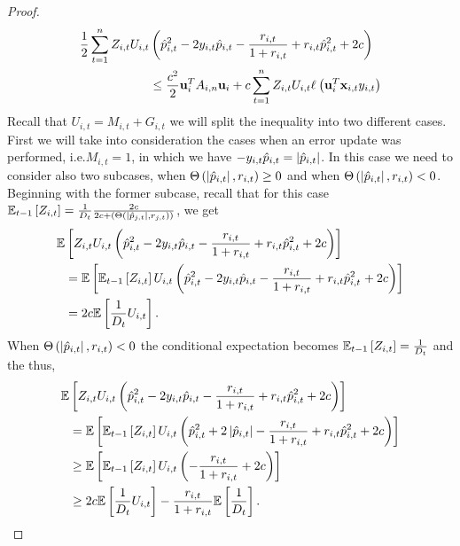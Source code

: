 \begin{proof}
\begin{equation}
\begin{split}
\frac{1}{2} \sum_{t=1}^{n}Z_{i,t}U_{i,t}&\left({\hat{p}_{i,t}^2-2y_{i,t}\hat{p}_{i,t}-\frac{r_{i,t}}{1+r_{i,t}}+r_{i,t}\hat{p}_{i,t}^{2}+2c}\right)\\
&\le\frac{c^2}{2} \mathbf{u}_i^T A_{i,n} \mathbf{u}_i+c\sum_{t=1}^{n}{Z_{i,t}U_{i,t}\ell_{}\left({\mathbf{u}_i^T\mathbf{x}_{i,t}y_{i,t}}\right)}
\label{sec_order_2}
\end{split}
\end{equation}
Recall that $U_{i,t}=M_{i,t}+G_{i,t}$ we will split the inequality into two different cases. First we will take into consideration the cases when an error update was performed, i.e.$M_{i,t}=1$, in which we have $-y_{i,t}\hat{p}_{i,t}=\left\vert{\hat{p}_{i,t}}\right\vert$. In this case we need to consider also two subcases, when $\Theta\left({\left\vert{\hat{p}_{i,t}}\right\vert,r_{i,t}}\right)\ge0$   and when $\Theta\left({\left\vert{\hat{p}_{i,t}}\right\vert,r_{i,t}}\right)<0$. Beginning with the former subcase, recall that for this case 
$\mathbb{E}_{t-1}\left[{Z_{i,t}}\right]=\frac{1}{D_{t}}\frac{2c}{2c+\left({\Theta\left({\left\vert{\hat{p}_{j,t}}\right\vert,r_{j,t}}\right)}\right)}$, we get 
\begin{equation*}
\begin{split}
\mathbb{E}&\left[{Z_{i,t}U_{i,t}\left({\hat{p}_{i,t}^2-2y_{i,t}\hat{p}_{i,t}-\frac{r_{i,t}}{1+r_{i,t}}+r_{i,t}\hat{p}_{i,t}^{2}+2c}\right)}\right]\\
&=\mathbb{E}\left[{\mathbb{E}_{t-1}\left[{Z_{i,t}}\right]U_{i,t}\left({\hat{p}_{i,t}^2-2y_{i,t}\hat{p}_{i,t}-\frac{r_{i,t}}{1+r_{i,t}}+r_{i,t}\hat{p}_{i,t^{}}^{2}+2c}\right)}\right]\\
&=2c\mathbb{E}\left[{\frac{1}{D_t}U_{i,t}}\right].
\end{split}
\end{equation*}
When $\Theta\left({\left\vert{\hat{p}_{i,t}}\right\vert,r_{i,t}}\right)<0$  the conditional expectation becomes $\mathbb{E}_{t-1}\left[{Z_{i,t}}\right]=\frac{1}{D_t}$ and the thus,
\begin{equation*}
\begin{split}
\mathbb{E}&\brackets{Z_{i,t}U_{i,t}\paren{\hat{p}_{i,t}^2-2y_{i,t}\hat{p}_{i,t}-\frac{r_{i,t}}{1+r_{i,t}}+r_{i,t}\hat{p}_{i,t}^{2}+2c}}\\
&=\mathbb{E}\brackets{\mathbb{E}_{t-1}\brackets{Z_{i,t}}U_{i,t}\paren{\hat{p}_{i,t}^2+2\abs{\hat{p}_{i,t}}-\frac{r_{i,t}}{1+r_{i,t}}+r_{i,t}\hat{p}_{i,t}^{2}+2c}}\\
&\ge\mathbb{E}\brackets{\mathbb{E}_{t-1}\brackets{Z_{i,t}}U_{i,t}\paren{-\frac{r_{i,t}}{1+r_{i,t}}+2c}}\\
&\ge 2c \mathbb{E}\brackets{\frac{1}{D_t}U_{i,t}}-\frac{r_{i,t}}{1+r_{i,t}}\mathbb{E}\brackets{\frac{1}{D_t}}.

\end{split}
\end{equation*}
\end{proof}
